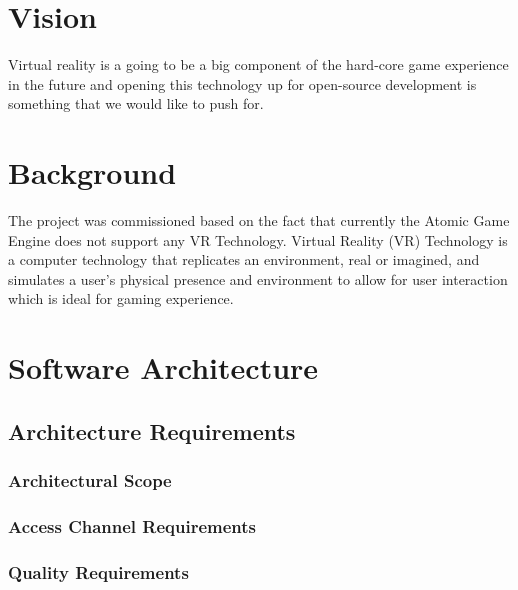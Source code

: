 \documentclass[a4paper,12pt]{article}
\begin{document}
\newpage
\section{Vision}
Virtual reality is a going to be a big component of the hard-core game experience in the future and opening this technology up for open-source development is something that we would like to push for.
\newpage
\section{Background}
\begin{itemize}
The project was commissioned based on the fact that currently the Atomic Game Engine does not support any VR Technology. Virtual Reality (VR) Technology is a computer technology that replicates an environment, real or imagined, and simulates a user's physical presence and environment to allow for user interaction which is ideal for gaming experience.  
\end{itemize}

\newpage
\section{Software Architecture}
\subsection{Architecture Requirements}
\subsubsection{Architectural Scope}

\subsubsection{Access Channel Requirements}

\subsubsection{Quality Requirements}
\end{document}
